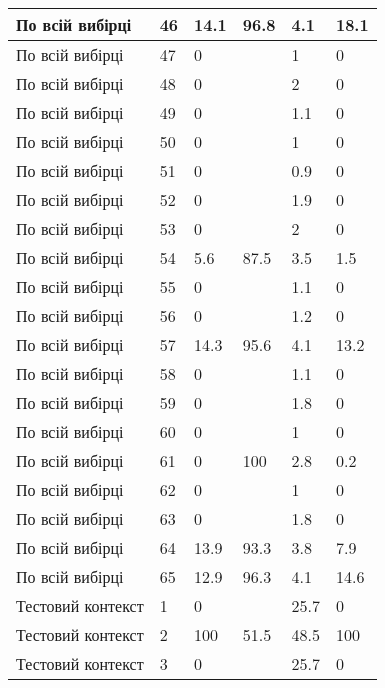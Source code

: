 \begin{longtable}[c]{ | p{2cm} | p{2cm} | p{2cm} | p{2cm} | p{3cm} | p{3cm} | }
	По всій вибірці & 46 & 14.1 & 96.8 & 4.1 & 18.1 \\
	\hline
	По всій вибірці & 47 & 0 &  & 1 & 0 \\
	\hline
	По всій вибірці & 48 & 0 &  & 2 & 0 \\
	\hline
	По всій вибірці & 49 & 0 &  & 1.1 & 0 \\
	\hline
	По всій вибірці & 50 & 0 &  & 1 & 0 \\
	\hline
	По всій вибірці & 51 & 0 &  & 0.9 & 0 \\
	\hline
	По всій вибірці & 52 & 0 &  & 1.9 & 0 \\
	\hline
	По всій вибірці & 53 & 0 &  & 2 & 0 \\
	\hline
	По всій вибірці & 54 & 5.6 & 87.5 & 3.5 & 1.5 \\
	\hline
	По всій вибірці & 55 & 0 &  & 1.1 & 0 \\
	\hline
	По всій вибірці & 56 & 0 &  & 1.2 & 0 \\
	\hline
	По всій вибірці & 57 & 14.3 & 95.6 & 4.1 & 13.2 \\
	\hline
	По всій вибірці & 58 & 0 &  & 1.1 & 0 \\
	\hline
	По всій вибірці & 59 & 0 &  & 1.8 & 0 \\
	\hline
	По всій вибірці & 60 & 0 &  & 1 & 0 \\
	\hline
	По всій вибірці & 61 & 0 & 100 & 2.8 & 0.2 \\
	\hline
	По всій вибірці & 62 & 0 &  & 1 & 0 \\
	\hline
	По всій вибірці & 63 & 0 &  & 1.8 & 0 \\
	\hline
	По всій вибірці & 64 & 13.9 & 93.3 & 3.8 & 7.9 \\
	\hline
	По всій вибірці & 65 & 12.9 & 96.3 & 4.1 & 14.6 \\
	\hline
	\hline
	\hline
	Тестовий контекст & 1 & 0 &  & 25.7 & 0 \\
	\hline
	Тестовий контекст & 2 & 100 & 51.5 & 48.5 & 100 \\
	\hline
	Тестовий контекст & 3 & 0 &  & 25.7 & 0 \\
\end{longtable}%

